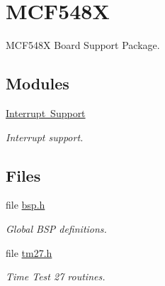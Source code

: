 \hypertarget{group__RTEMSBSPsM68kGenMCF548X}{}\section{M\+C\+F548X}
\label{group__RTEMSBSPsM68kGenMCF548X}


M\+C\+F548X Board Support Package.  


\subsection*{Modules}
\begin{DoxyCompactItemize}
\item 
\mbox{\hyperlink{group__genmcf548x__interrupt}{Interrupt Support}}
\begin{DoxyCompactList}\small\item\em Interrupt support. \end{DoxyCompactList}\end{DoxyCompactItemize}
\subsection*{Files}
\begin{DoxyCompactItemize}
\item 
file \mbox{\hyperlink{bsps_2m68k_2genmcf548x_2include_2bsp_8h}{bsp.\+h}}
\begin{DoxyCompactList}\small\item\em Global B\+SP definitions. \end{DoxyCompactList}\item 
file \mbox{\hyperlink{m68k_2genmcf548x_2include_2tm27_8h}{tm27.\+h}}
\begin{DoxyCompactList}\small\item\em Time Test 27 routines. \end{DoxyCompactList}\end{DoxyCompactItemize}
